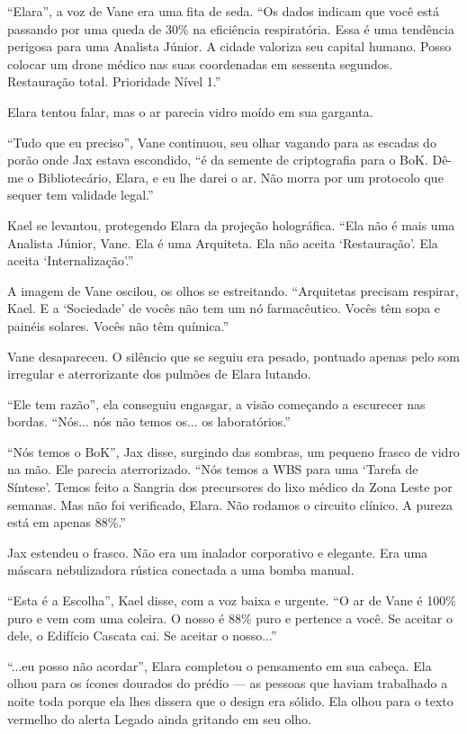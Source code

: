 ``Elara'', a voz de Vane era uma fita de seda. ``Os dados indicam que você está passando por uma queda de 30\% na eficiência respiratória. Essa é uma tendência perigosa para uma Analista Júnior. A cidade valoriza seu capital humano. Posso colocar um drone médico nas suas coordenadas em sessenta segundos. Restauração total. Prioridade Nível 1.''

Elara tentou falar, mas o ar parecia vidro moído em sua garganta.

``Tudo que eu preciso'', Vane continuou, seu olhar vagando para as escadas do porão onde Jax estava escondido, ``é da semente de criptografia para o BoK. Dê-me o Bibliotecário, Elara, e eu lhe darei o ar. Não morra por um protocolo que sequer tem validade legal.''

Kael se levantou, protegendo Elara da projeção holográfica. ``Ela não é mais uma Analista Júnior, Vane. Ela é uma Arquiteta. Ela não aceita `Restauração'. Ela aceita `Internalização'.''

A imagem de Vane oscilou, os olhos se estreitando. ``Arquitetas precisam respirar, Kael. E a `Sociedade' de vocês não tem um nó farmacêutico. Vocês têm sopa e painéis solares. Vocês não têm química.''

Vane desapareceu. O silêncio que se seguiu era pesado, pontuado apenas pelo som irregular e aterrorizante dos pulmões de Elara lutando.

``Ele tem razão'', ela conseguiu engasgar, a visão começando a escurecer nas bordas. ``Nós... nós não temos os... os laboratórios.''

``Nós temos o BoK'', Jax disse, surgindo das sombras, um pequeno frasco de vidro na mão. Ele parecia aterrorizado. ``Nós temos a WBS para uma `Tarefa de Síntese'. Temos feito a Sangria dos precursores do lixo médico da Zona Leste por semanas. Mas não foi verificado, Elara. Não rodamos o circuito clínico. A pureza está em apenas 88\%.''

Jax estendeu o frasco. Não era um inalador corporativo e elegante. Era uma máscara nebulizadora rústica conectada a uma bomba manual.

``Esta é a Escolha'', Kael disse, com a voz baixa e urgente. ``O ar de Vane é 100\% puro e vem com uma coleira. O nosso é 88\% puro e pertence a você. Se aceitar o dele, o Edifício Cascata cai. Se aceitar o nosso...''

``...eu posso não acordar'', Elara completou o pensamento em sua cabeça. Ela olhou para os ícones dourados do prédio --- as pessoas que haviam trabalhado a noite toda porque ela lhes dissera que o design era sólido. Ela olhou para o texto vermelho do alerta Legado ainda gritando em seu olho.

